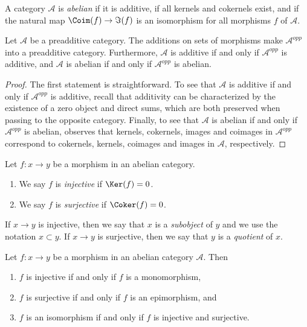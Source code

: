 \begin{definition}
\label{definition-abelian-category}
A category $\mathcal{A}$ is {\it abelian} if
it is additive, if all kernels and cokernels exist,
and if the natural map $\Coim(f) \to \Im(f)$
is an isomorphism for all morphisms $f$ of
$\mathcal{A}$.
\end{definition}

\begin{lemma}
\label{lemma-abelian-opposite}
Let $\mathcal{A}$ be a preadditive category.
The additions on sets of morphisms make
$\mathcal{A}^{opp}$ into a preadditive category.
Furthermore, $\mathcal{A}$ is additive if and only if $\mathcal{A}^{opp}$
is additive, and
$\mathcal{A}$ is abelian if and only if $\mathcal{A}^{opp}$ is abelian.
\end{lemma}

\begin{proof}
The first statement is straightforward.
To see that $\mathcal{A}$ is additive if and only if $\mathcal{A}^{opp}$
is additive, recall that additivity can be characterized by
the existence of a zero object and direct sums, which are both
preserved when passing to the opposite category.
Finally, to see that
$\mathcal{A}$ is abelian if and only if $\mathcal{A}^{opp}$ is abelian,
observes that kernels, cokernels, images and coimages in
$\mathcal{A}^{opp}$ correspond to
cokernels, kernels, coimages and images in $\mathcal{A}$,
respectively.
\end{proof}

\begin{definition}
\label{definition-injective-surjective}
Let $f : x \to y$ be a morphism in an abelian category.
\begin{enumerate}
\item We say $f$ is {\it injective} if $\Ker(f) = 0$.
\item We say $f$ is {\it surjective} if $\Coker(f) = 0$.
\end{enumerate}
If $x \to y$ is injective, then we say that $x$ is a {\it subobject}
of $y$ and we use the notation $x \subset y$. If $x \to y$ is
surjective, then we say that $y$ is a {\it quotient} of $x$.
\end{definition}

\begin{lemma}
\label{lemma-characterize-injective}
Let $f : x \to y$ be a morphism in an abelian category $\mathcal{A}$. Then
\begin{enumerate}
\item $f$ is injective if and only if $f$ is a monomorphism,
\item $f$ is surjective if and only if $f$ is an epimorphism, and
\item $f$ is an isomorphism if and only if $f$ is injective and surjective.
\end{enumerate}
\end{lemma}

